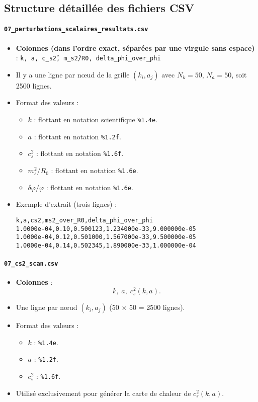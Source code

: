 \subsection{Structure détaillée des fichiers CSV}

\paragraph{\texttt{07\_perturbations\_scalaires\_resultats.csv}}  
\begin{itemize}
  \item \textbf{Colonnes (dans l’ordre exact, séparées par une virgule sans espace)} :  
  \texttt{k, a, c\_s\^2, m\_s\^2/R0, delta\_phi\_over\_phi}
  \item Il y a une ligne par nœud de la grille \((k_{i},a_{j})\) avec \(N_{k}=50\), \(N_{a}=50\), soit 2500 lignes.
  \item Format des valeurs :
  \begin{itemize}
    \item \(k\) : flottant en notation scientifique \texttt{\%1.4e}.
    \item \(a\) : flottant en notation \texttt{\%1.2f}.
    \item \(c_{s}^{2}\) : flottant en notation \texttt{\%1.6f}.
    \item \(m_{s}^{2}/R_{0}\) : flottant en notation \texttt{\%1.6e}.
    \item \(\delta\varphi/\varphi\) : flottant en notation \texttt{\%1.6e}.
  \end{itemize}
  \item Exemple d’extrait (trois lignes) :
    \begin{verbatim}
k,a,cs2,ms2_over_R0,delta_phi_over_phi
1.0000e-04,0.10,0.500123,1.234000e-33,9.000000e-05
1.0000e-04,0.12,0.501000,1.567000e-33,9.500000e-05
1.0000e-04,0.14,0.502345,1.890000e-33,1.000000e-04
    \end{verbatim}
\end{itemize}

\paragraph{\texttt{07\_cs2\_scan.csv}}  
\begin{itemize}
  \item \textbf{Colonnes} :
    \[
      k,\;a,\;c_{s}^{2}(k,a).
    \]
  \item Une ligne par nœud \((k_{i},a_{j})\) (50 × 50 = 2500 lignes).
  \item Format des valeurs :
  \begin{itemize}
    \item \(k\) : \texttt{\%1.4e}.
    \item \(a\) : \texttt{\%1.2f}.
    \item \(c_{s}^{2}\) : \texttt{\%1.6f}.
  \end{itemize}
  \item Utilisé exclusivement pour générer la carte de chaleur de \(c_{s}^{2}(k,a)\).
\end{itemize}

